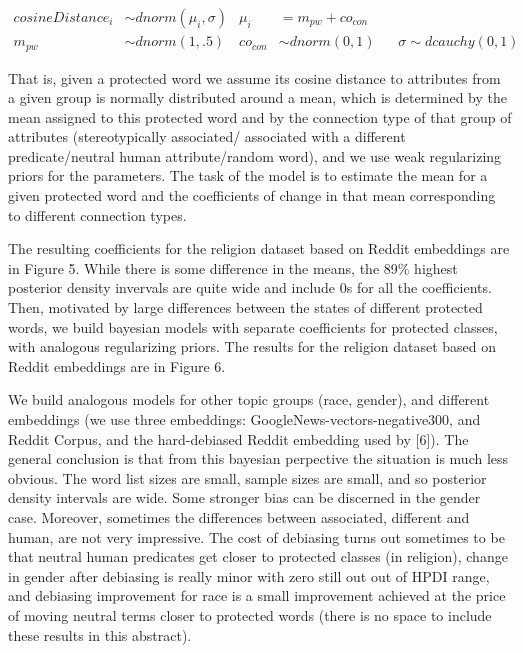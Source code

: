 \documentclass[
  12pt,
  dvipsnames,enabledeprecatedfontcommands]{scrartcl}
\begin{document}
\footnotesize

\vspace{-5mm}

\begin{align}
cosineDistance_i  & \sim dnorm(\mu_i, \sigma) &
\mu_i & = m_{pw} + co_{con} \tag{Model}\\
m_{pw} & \sim dnorm(1,.5)  & 
co_{con} & \sim dnorm(0,1)  \,\,\,\,\,
 & \sigma  \sim  dcauchy(0,1) \tag{Priors}
\end{align} \normalsize 

\vspace{-2mm}

\noindent That is, given a protected word we assume its cosine distance
to attributes from a given group is normally distributed around a mean,
which is determined by the mean assigned to this protected word and by
the connection type of that group of attributes (stereotypically
associated/ associated with a different predicate/neutral human
attribute/random word), and we use weak regularizing priors for the
parameters. The task of the model is to estimate the mean for a given
protected word and the coefficients of change in that mean corresponding
to different connection types.

The resulting coefficients for the religion dataset based on Reddit
embeddings are in Figure 5. While there is some difference in the means,
the 89\% highest posterior density invervals are quite wide and include
0s for all the coefficients. Then, motivated by large differences
between the states of different protected words, we build bayesian
models with separate coefficients for protected classes, with analogous
regularizing priors. The results for the religion dataset based on
Reddit embeddings are in Figure 6.

We build analogous models for other topic groups (race, gender), and
different embeddings (we use three embeddings:
GoogleNews-vectors-negative300, and Reddit Corpus, and the hard-debiased
Reddit embedding used by {[}6{]}). The general conclusion is that from
this bayesian perpective the situation is much less obvious. The word
list sizes are small, sample sizes are small, and so posterior density
intervals are wide. Some stronger bias can be discerned in the gender
case. Moreover, sometimes the differences between associated, different
and human, are not very impressive. The cost of debiasing turns out
sometimes to be that neutral human predicates get closer to protected
classes (in religion), change in gender after debiasing is really minor
with zero still out out of HPDI range, and debiasing improvement for
race is a small improvement achieved at the price of moving neutral
terms closer to protected words (there is no space to include these
results in this abstract).
\end{document}
